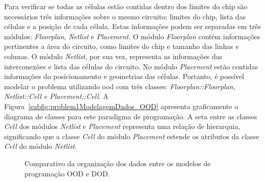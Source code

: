 Para verificar se todas as células estão contidas dentro dos limites do chip são necessários três informações sobre o mesmo circuito: limites do chip, lista das células e a posição de cada célula.
Estas informações podem ser separadas em três módulos: \textit{Floorplan}, \textit{Netlist} e \textit{Placement}.
O módulo \textit{Floorplan} contém informações pertinentes a área do circuito, como limites do chip e tamanho das linhas e colunas.
O módulo \textit{Netlist}, por sua vez, representa as informações das interconexões e lista das células do circuito.
No módulo \textit{Placement} estão contidas informações do posicionamento e geometrias das células.
Portanto, é possível modelar o problema utilizando \ac{ood} com três classes: \textit{Floorplan::Floorplan, Netlist::Cell e Placement::Cell}.
A Figura~\ref{subfig:problem1ModelagemDados_OOD} apresenta graficamente o diagrama de classes para este paradigma de programação.
A seta entre as classes \textit{Cell} dos módulos \textit{Netlist} e \textit{Placement} representa uma relação de hierarquia, significando que a classe \textit{Cell} do módulo \textit{Placement} estende os atributos da classe \textit{Cell} do módulo \textit{Netlist}.

\begin{figure}[h!t]
    \centering
    
    \caption[Organização dos dados estudo de caso 1]{Comparativo da organização dos dados entre os modelos de programação OOD e DOD.}
    \label{fig:problem1ModelagemDados}
\end{figure}

